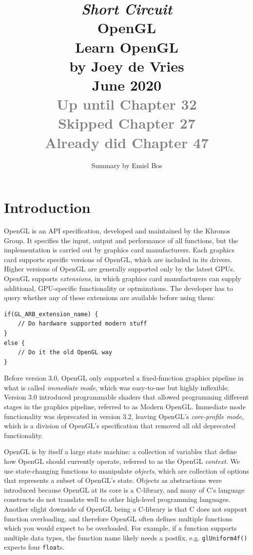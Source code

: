 \documentclass[table, xcdraw]{article}%
\title{
\textit{Short Circuit}\\
\vspace{15px}
\huge
OpenGL\\
\vspace{20px}
\large
Learn OpenGL\\
by Joey de Vries\\
June 2020\\
\textcolor{gray}{Up until Chapter 32\\Skipped Chapter 27\\Already did Chapter 47}
}
\author{Summary by Emiel Bos}
\date{}
\begin{document}
\maketitle

\section{Introduction} \label{intro}

OpenGL is an API specification, developed and maintained by the Khronos Group. It specifies the input, output and performance of all functions, but the implementation is carried out by graphics card manufacturers. Each graphics card supports specific versions of OpenGL, which are included in its drivers. Higher versions of OpenGL are generally supported only by the latest GPUs. OpenGL supports \emph{extensions}, in which graphics card manufacturers can supply additional, GPU-specific functionality or optmizations. The developer has to query whether any of these extensions are available before using them:

\begin{verbatim}
if(GL_ARB_extension_name) {
    // Do hardware supported modern stuff
}
else {
    // Do it the old OpenGL way
}
\end{verbatim}

Before version 3.0, OpenGL only supported a fixed-function graphics pipeline in what is called \emph{immediate mode}, which was easy-to-use but highly inflexible. Version 3.0 introduced programmable shaders that allowed programming different stages in the graphics pipeline, referred to as Modern OpenGL. Immediate mode functionality was deprecated in version 3.2, leaving OpenGL's \emph{core-profile mode}, which is a division of OpenGL's specification that removed all old deprecated functionality.

OpenGL is by itself a large state machine: a collection of variables that define how OpenGL should currently operate, referred to as the OpenGL \emph{context}. We use state-changing functions to manipulate \emph{objects}, which are collection of options that represents a subset of OpenGL's state. Objects as abstractions were introduced because OpenGL at its core is a C-library, and many of C's language constructs do not translate well to other high-level programming languages. Another slight downside of OpenGL being a C-library is that C does not support function overloading, and therefore OpenGL often defines multiple functions which you would expect to be overloaded. For example, if a function supports multiple data types, the function name likely needs a postfix, e.g. \texttt{glUniform4f()} expects four \texttt{float}s.
\end{document}
